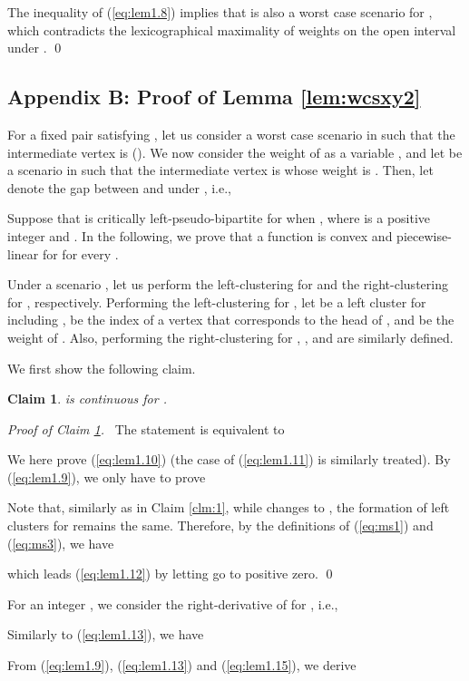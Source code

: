 \documentclass[a4paper]{llncs}
\newtheorem{clm}{Claim}
\begin{document}
The inequality of (\ref{eq:lem1.8}) implies that  is also a worst case scenario for ,
which contradicts the lexicographical maximality of weights on the open interval  under .
\qed






\subsection*{Appendix B: Proof of Lemma \ref{lem:wcsxy2}}
\label{app:b}
For a fixed pair  satisfying , 
let us consider a worst case scenario 
in  such that the intermediate vertex is  ().
We now consider the weight of  as a variable ,
and let 
 be a scenario in 
such that the intermediate vertex is  whose weight is .
Then, let  denote the gap between  and  under , i.e.,

Suppose that  is critically left-pseudo-bipartite for  when ,
where  is a positive integer and .
In the following, we prove that a function  is convex and piecewise-linear for  for every .


Under a scenario , let us perform the left-clustering for  and the right-clustering for , respectively.
Performing the left-clustering for ,
let  be a left cluster for  including , 
 be the index of a vertex that corresponds to the head of ,
and  be the weight of .
Also, performing the right-clustering for , ,  and  are similarly defined. 

We first show the following claim.
\begin{clm}
 is continuous for .
\label{clm:4}
\end{clm}
\noindent
{\it Proof of Claim \ref{clm:4}.} \
The statement is equivalent to

We here prove (\ref{eq:lem1.10}) (the case of (\ref{eq:lem1.11}) is similarly treated).
By (\ref{eq:lem1.9}), we only have to prove

Note that, similarly as in Claim \ref{clm:1}, while  changes to , 
the formation of left clusters for  remains the same.
Therefore, by the definitions of (\ref{eq:ms1}) and (\ref{eq:ms3}), we have 

which leads (\ref{eq:lem1.12}) by letting  go to positive zero.
\qed

\medskip

For an integer , we consider the right-derivative of  for , i.e.,

Similarly to (\ref{eq:lem1.13}), we have

From (\ref{eq:lem1.9}), (\ref{eq:lem1.13}) and (\ref{eq:lem1.15}), we derive
\end{document}
